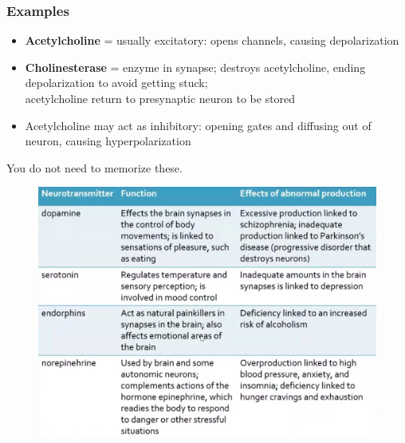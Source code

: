 \documentclass[a4paper,12pt]{article}
\begin{document}
\subsubsection{Examples}
\begin{itemize}
    \item{\textbf{Acetylcholine} = usually excitatory: opens  channels, causing depolarization}
    \item{\textbf{Cholinesterase} = enzyme in synapse; destroys acetylcholine, ending depolarization to avoid getting stuck; \\ acetylcholine return to presynaptic neuron to be stored}
    \item{Acetylcholine may act as inhibitory: opening  gates and diffusing  out of neuron, causing hyperpolarization}
        \\
\end{itemize}

You do not need to memorize these.
\begin{figure}[H]
    \centering
    \includegraphics[width=\textwidth]{transex}
\end{figure}
\end{document}
